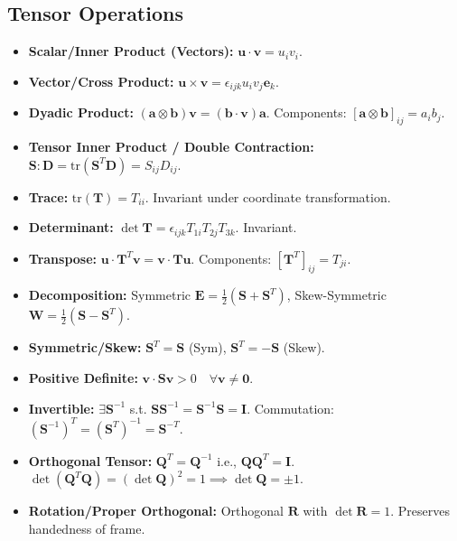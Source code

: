 \documentclass[10pt,twocolumn, a4paper]{article}
\begin{document}
\subsection{Tensor Operations}
\begin{itemize}
    \item \textbf{Scalar/Inner Product (Vectors):} $\bm{u} \cdot \bm{v} = u_i v_i$.
    \item \textbf{Vector/Cross Product:} $\bm{u} \times \bm{v} = \epsilon_{ijk} u_i v_j \bm{e}_k$.
    \item \textbf{Dyadic Product:} $(\bm{a} \otimes \bm{b})\bm{v} = (\bm{b} \cdot \bm{v})\bm{a}$. Components: $[\bm{a} \otimes \bm{b}]_{ij} = a_i b_j$.
    \item \textbf{Tensor Inner Product / Double Contraction:} $\bm{S} : \bm{D} = \text{tr}(\bm{S}^T \bm{D}) = S_{ij} D_{ij}$.
    \item \textbf{Trace:} $\text{tr}(\bm{T}) = T_{ii}$. Invariant under coordinate transformation.
    \item \textbf{Determinant:} $\det \bm{T} = \epsilon_{ijk} T_{1i} T_{2j} T_{3k}$. Invariant.
    \item \textbf{Transpose:} $\bm{u} \cdot \bm{T}^T \bm{v} = \bm{v} \cdot \bm{T} \bm{u}$. Components: $[\bm{T}^T]_{ij} = T_{ji}$.
    \item \textbf{Decomposition:} Symmetric $\bm{E} = \frac{1}{2}(\bm{S} + \bm{S}^T)$, Skew-Symmetric $\bm{W} = \frac{1}{2}(\bm{S} - \bm{S}^T)$.
    \item \textbf{Symmetric/Skew:} $\bm{S}^T = \bm{S}$ (Sym), $\bm{S}^T = -\bm{S}$ (Skew).
    \item \textbf{Positive Definite:} $\bm{v} \cdot \bm{S}\bm{v} > 0 \quad \forall \bm{v} \neq \bm{0}$.
    \item \textbf{Invertible:} $\exists \bm{S}^{-1}$ s.t. $\bm{S}\bm{S}^{-1} = \bm{S}^{-1}\bm{S} = \bm{I}$. Commutation: $(\bm{S}^{-1})^T = (\bm{S}^T)^{-1} = \bm{S}^{-T}$.    
    \item \textbf{Orthogonal Tensor:} $\bm{Q}^T = \bm{Q}^{-1}$ i.e., $\bm{Q}\bm{Q}^T = \bm{I}$. $\det(\bm{Q}^T \bm{Q}) = (\det \bm{Q})^2 = 1 \implies \det \bm{Q} = \pm 1$.
    \item \textbf{Rotation/Proper Orthogonal:} Orthogonal $\bm{R}$ with $\det \bm{R} = 1$. Preserves handedness of frame.
\end{itemize}
\end{document}
